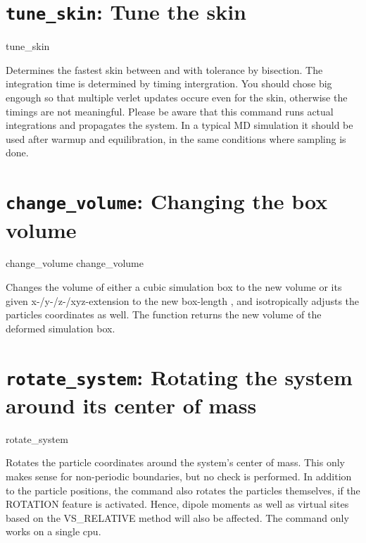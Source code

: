 \section{\texttt{tune_skin}: Tune the skin}

\begin{essyntax}
   tune_skin    
\end{essyntax}

Determines the fastest skin between  and  with tolerance 
by bisection. The integration time is determined by timing  intergration.
You should chose  big engough so that multiple verlet updates occure even
for the  skin, otherwise the timings are not meaningful. Please be aware that
this command runs actual integrations and propagates the system. In a typical MD simulation
it should be used after warmup and equilibration, in the same conditions where sampling
is done.

\section{\texttt{change_volume}: Changing the box volume}

\begin{essyntax}
   change_volume  
   change_volume  
\end{essyntax}
Changes the volume of either a cubic simulation box to the new volume
 or its given x-/y-/z-/xyz-extension to the new
box-length , and isotropically adjusts the
particles coordinates as well. The function returns the new volume of
the deformed simulation box.

\section{\texttt{rotate_system}: Rotating the system around its center of mass}

\begin{essyntax}
   rotate_system   
\end{essyntax}

Rotates the particle coordinates around the system's center of mass. This only makes sense for non-periodic boundaries, but no check is performed. 
In addition to the particle positions, the command also rotates the particles themselves, if the ROTATION feature is activated. Hence, dipole moments as well as virtual sites based on the VS\_RELATIVE method will also be affected.
The command only works on a single cpu.

